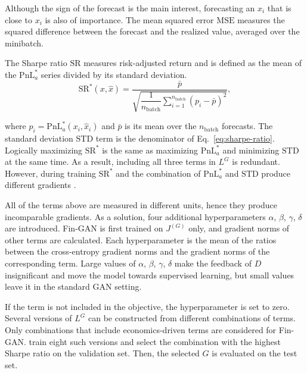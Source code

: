 Although the sign of the forecast is the main interest, forecasting an $\hat{x}_i$ that is close to $x_i$ is also of importance. The mean squared error $\mathrm{MSE}$ measures the squared difference between the forecast and the realized value, averaged over the minibatch.

The Sharpe ratio $\mathrm{SR}$ measures risk-adjusted return and is defined as the mean of the $\mathrm{PnL}^{*}_{a}$ series divided by its standard deviation. 
\begin{equation}
\mathrm{SR}^{*}(x, \hat{x}) = \frac{\bar{p}}{\sqrt{\dfrac{1}{n_{\text{batch}}} \sum_{i=1}^{n_{\text{batch}}} \left( p_i - \bar{p} \right)^{2}}},
\label{eq:sharpe-ratio}
\end{equation}

where $p_i = \mathrm{PnL}^{*}_{a}(x_i, \hat{x}_i)$ and $\bar{p}$ is its mean over the $n_{\mathrm{batch}}$ forecasts. The standard deviation $\mathrm{STD}$ term is the denominator of Eq.~\ref{eq:sharpe-ratio}. Logically maximizing $\mathrm{SR}^{*}$ is the same as maximizing $\mathrm{PnL}^{*}_{a}$ and minimizing $\mathrm{STD}$ at the same time. As a result, including all three terms in $L^{G}$ is redundant. However, during training $\mathrm{SR}^{*}$ and the combination of $\mathrm{PnL}^{*}_{a}$ and $\mathrm{STD}$ produce different gradients \parencite{vuleticFinGANForecastingClassifying2024}.

All of the terms above are measured in different units, hence they produce incomparable gradients. As a solution, four additional hyperparameters $\alpha$, $\beta$, $\gamma$, $\delta$ are introduced. Fin-GAN is first trained on $J^{(G)}$ only, and gradient norms of other terms are calculated. Each hyperparameter is the mean of the ratios between the cross-entropy gradient norms and the gradient norms of the corresponding term.
Large values of $\alpha$, $\beta$, $\gamma$, $\delta$ make the feedback of $D$ insignificant and move the model towards supervised learning, but small values leave it in the standard GAN setting.

If the term is not included in the objective, the hyperparameter is set to zero. Several versions of $L^{G}$ can be constructed from different combinations of terms. Only combinations that include economics-driven terms are considered for Fin-GAN. \textcite{vuleticFinGANForecastingClassifying2024} train eight such versions and select the combination with the highest Sharpe ratio on the validation set. Then, the selected $G$ is evaluated on the test set.


